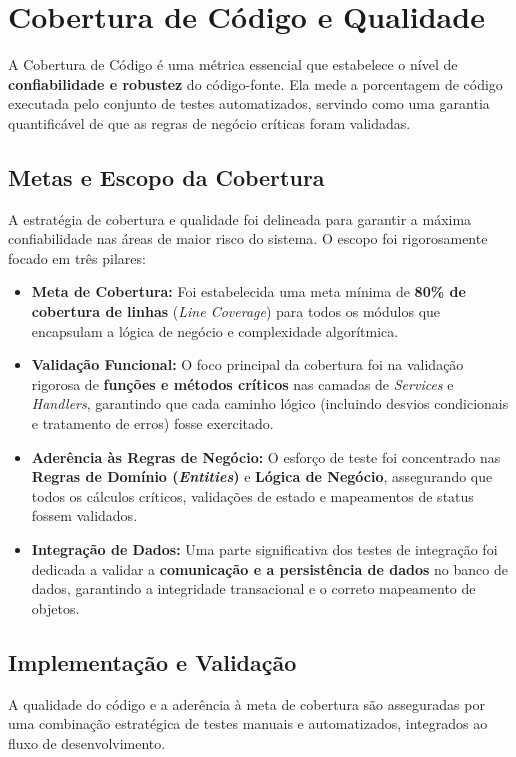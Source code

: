 \documentclass[
	12pt,				%
	openany,			%
	twoside,			%
	a4paper,			%
	english,			%
	brazil				%
	]{abntex2}
\begin{document}
\section{Cobertura de Código e Qualidade} %
A Cobertura de Código é uma métrica essencial que estabelece o nível de \textbf{confiabilidade e robustez} do código-fonte. Ela mede a porcentagem de código executada pelo conjunto de testes automatizados, servindo como uma garantia quantificável de que as regras de negócio críticas foram validadas.

\subsection{Metas e Escopo da Cobertura}
A estratégia de cobertura e qualidade foi delineada para garantir a máxima confiabilidade nas áreas de maior risco do sistema. O escopo foi rigorosamente focado em três pilares:

\begin{itemize}
    \item \textbf{Meta de Cobertura:} Foi estabelecida uma meta mínima de \textbf{80\% de cobertura de linhas} (\textit{Line Coverage}) para todos os módulos que encapsulam a lógica de negócio e complexidade algorítmica.
    \item \textbf{Validação Funcional:} O foco principal da cobertura foi na validação rigorosa de \textbf{funções e métodos críticos} nas camadas de \textit{Services} e \textit{Handlers}, garantindo que cada caminho lógico (incluindo desvios condicionais e tratamento de erros) fosse exercitado.
    \item \textbf{Aderência às Regras de Negócio:} O esforço de teste foi concentrado nas \textbf{Regras de Domínio (\textit{Entities})} e \textbf{Lógica de Negócio}, assegurando que todos os cálculos críticos, validações de estado e mapeamentos de status fossem validados.
    \item \textbf{Integração de Dados:} Uma parte significativa dos testes de integração foi dedicada a validar a \textbf{comunicação e a persistência de dados} no banco de dados, garantindo a integridade transacional e o correto mapeamento de objetos.
\end{itemize}

\subsection{Implementação e Validação}
A qualidade do código e a aderência à meta de cobertura são asseguradas por uma combinação estratégica de testes manuais e automatizados, integrados ao fluxo de desenvolvimento.
\end{document}

